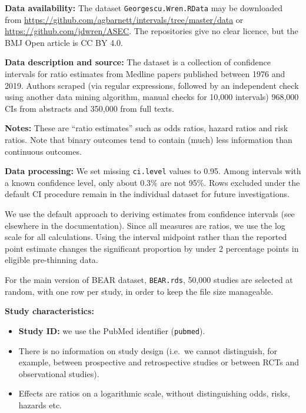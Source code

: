 \documentclass[
  11pt,
]{article}
\providecommand{\tightlist}{%
  \setlength{\itemsep}{0pt}\setlength{\parskip}{0pt}}
\begin{document}
\textbf{Data availability:} The dataset \texttt{Georgescu.Wren.RData}
may be downloaded from
\url{https://github.com/agbarnett/intervals/tree/master/data} or
\url{https://github.com/jdwren/ASEC}. The repositories give no clear
licence, but the BMJ Open article is CC BY 4.0.

\textbf{Data description and source:} The dataset is a collection of
confidence intervals for ratio estimates from Medline papers published
between 1976 and 2019. Authors scraped (via regular expressions,
followed by an independent check using another data mining algorithm,
manual checks for 10,000 intervals) 968,000 CIs from abstracts and
350,000 from full texts.

\textbf{Notes:} These are ``ratio estimates'' such as odds ratios,
hazard ratios and risk ratios. Note that binary outcomes tend to contain
(much) less information than continuous outcomes.

\textbf{Data processing:} We set missing \texttt{ci.level} values to
0.95. Among intervals with a known confidence level, only about 0.3\%
are not 95\%. Rows excluded under the default CI procedure remain in the
individual dataset for future investigations.

We use the default approach to deriving estimates from confidence
intervals (see elsewhere in the documentation). Since all measures are
ratios, we use the log scale for all calculations. Using the interval
midpoint rather than the reported point estimate changes the significant
proportion by under 2 percentage points in eligible pre-thinning data.

For the main version of BEAR dataset, \texttt{BEAR.rds}, 50,000 studies
are selected at random, with one row per study, in order to keep the
file size manageable.

\textbf{Study characteristics:}

\begin{itemize}
\tightlist
\item
  \textbf{Study ID:} we use the PubMed identifier (\texttt{pubmed}).
\item
  There is no information on study design (i.e.~we cannot distinguish,
  for example, between prospective and retrospective studies or between
  RCTs and observational studies).
\item
  Effects are ratios on a logarithmic scale, without distinguishing
  odds, risks, hazards etc.
\end{itemize}

\newpage
\end{document}
